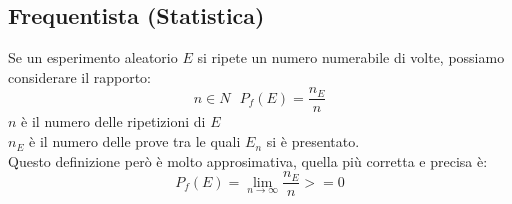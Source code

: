 \subsection{Frequentista (Statistica)}
Se un esperimento aleatorio $E$ si ripete un numero numerabile di volte, possiamo considerare il rapporto:
$$ n \in N \:\:\: P_f(E) = \frac{n_E}{n}$$
$n$ è il numero delle ripetizioni di $E$\\
$n_E$ è il numero delle prove tra le quali $E_n$ si è presentato.\\
Questo definizione però è molto approsimativa, quella più corretta e precisa è:\\
 \[ P_f(E) = \lim_{n\to\infty} \frac{n_E}{n} >= 0 \]
 
 







